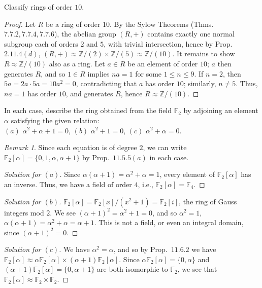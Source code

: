 \documentclass[12pt]{article}
\theoremstyle{remark}
\newtheorem*{remark}{Remark}
\begin{document}
\begin{problem}
  Classify rings of order $10$.
\end{problem}
\begin{proof}
  Let $R$ be a ring of order 10. By the Sylow Theorems (Thms.~$7.7.2,7.7.4,7.7.6$), the abelian group $(R,+)$ contains exactly one normal subgroup each of orders $2$ and $5$, with trivial intersection, hence by Prop.~$2.11.4(d)$, $(R,+) \approx \mathbb{Z}/(2) \times \mathbb{Z}/(5) \approx \mathbb{Z}/(10)$. It remains to show $R \approx \mathbb{Z}/(10)$ also as a ring. Let $a \in R$ be an element of order $10$; $a$ then generates $R$, and so $1 \in R$ implies $na = 1$ for some $1 \le n \le 9$. If $n = 2$, then $5a = 2a \cdot 5a = 10a^2 = 0$, contradicting that $a$ has order $10$; similarly, $n \ne 5$. Thus, $na = 1$ has order $10$, and generates $R$, hence $R \approx \mathbb{Z}/(10)$.
\end{proof}

\begin{problem}\label{exc:11.6.4}
  In each case, describe the ring obtained from the field $\mathbb{F}_2$ by adjoining an element $\alpha$ satisfying the given relation:\\
  $(a)$ $\alpha^2+\alpha+1=0$, $(b)$ $\alpha^2+1=0$, $(c)$ $\alpha^2+\alpha=0$.
\end{problem}
\begin{remark}
  Since each equation is of degree $2$, we can write $\mathbb{F}_2[\alpha] = \{0,1,\alpha,\alpha+1\}$ by Prop.~$11.5.5(a)$ in each case.
\end{remark}
\begin{proof}[Solution for $(a)$]
  Since $\alpha(\alpha + 1) = \alpha^2 + \alpha = 1$, every element of $\mathbb{F}_2[\alpha]$ has an inverse. Thus, we have a field of order $4$, i.e., $\mathbb{F}_2[\alpha] = \mathbb{F}_4$.
\end{proof}
\begin{proof}[Solution for $(b)$]
  $\mathbb{F}_2[\alpha] = \mathbb{F}_2[x]/(x^2+1) = \mathbb{F}_2[i]$, the ring of Gauss integers mod $2$. We see $(\alpha+1)^2 = \alpha^2+1 = 0$, and so $\alpha^2 = 1$, $\alpha(\alpha+1) = \alpha^2 + \alpha = \alpha+1$. This is not a field, or even an integral domain, since $(\alpha+1)^2 = 0$.
\end{proof}
\begin{proof}[Solution for $(c)$]
  We have $\alpha^2 = \alpha$, and so by Prop.~$11.6.2$ we have $\mathbb{F}_2[\alpha] \approx \alpha\mathbb{F}_2[\alpha] \times (\alpha+1)\mathbb{F}_2[\alpha]$. Since $\alpha\mathbb{F}_2[\alpha] = \{0,\alpha\}$ and $(\alpha+1)\mathbb{F}_2[\alpha] = \{0,\alpha+1\}$ are both isomorphic to $\mathbb{F}_2$, we see that $\mathbb{F}_2[\alpha] \approx \mathbb{F}_2 \times \mathbb{F}_2$.
\end{proof}
\end{document}
